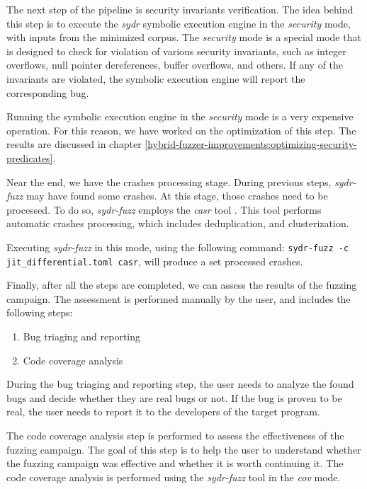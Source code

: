 
The next step of the pipeline is security invariants verification. The idea behind this step is to execute the \textit{sydr} symbolic execution engine in the \textit{security} mode, with inputs from the minimized corpus. The \textit{security} mode is a special mode that is designed to check for violation of various security invariants, such as integer overflows, null pointer dereferences, buffer overflows, and others. If any of the invariants are violated, the symbolic execution engine will report the corresponding bug.

Running the symbolic execution engine in the \textit{security} mode is a very expensive operation. For this reason, we have worked on the optimization of this step. The results are discussed in chapter \ref{hybrid-fuzzer-improvements:optimizing-security-predicates}.


Near the end, we have the crashes processing stage. During previous steps, \textit{sydr-fuzz} may have found some crashes. At this stage, those crashes need to be processed. To do so, \textit{sydr-fuzz} employs the \textit{casr} tool \cite{casr-cluster-ispras-2021}. This tool performs automatic crashes processing, which includes deduplication, and clusterization.

Executing \textit{sydr-fuzz} in this mode, using the following command: \texttt{sydr-fuzz -c jit\_differential.toml casr}, will produce a set processed crashes.

Finally, after all the steps are completed, we can assess the results of the fuzzing campaign. The assessment is performed manually by the user, and includes the following steps:

\begin{enumerate}
    \item Bug triaging and reporting
    \item Code coverage analysis
\end{enumerate}

During the bug triaging and reporting step, the user needs to analyze the found bugs and decide whether they are real bugs or not. If the bug is proven to be real, the user needs to report it to the developers of the target program.

The code coverage analysis step is performed to assess the effectiveness of the fuzzing campaign. The goal of this step is to help the user to understand whether the fuzzing campaign was effective and whether it is worth continuing it. The code coverage analysis is performed using the \textit{sydr-fuzz} tool in the \textit{cov} mode.

